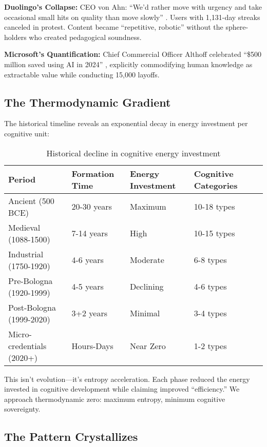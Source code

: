 \textbf{Duolingo's Collapse:} CEO von Ahn: ``We'd rather move with urgency and take occasional small hits on quality than move slowly'' \citep{vonahn2024}. Users with 1,131-day streaks canceled in protest. Content became ``repetitive, robotic'' without the sphere-holders who created pedagogical soundness.

\textbf{Microsoft's Quantification:} Chief Commercial Officer Althoff celebrated ``\$500 million saved using AI in 2024'' \citep{althoff2024}, explicitly commodifying human knowledge as extractable value while conducting 15,000 layoffs.

\subsection{The Thermodynamic Gradient}

The historical timeline reveals an exponential decay in energy investment per cognitive unit:

\begin{table}[h]
\centering
\begin{tabular}{lllll}
\hline
\textbf{Period} & \textbf{Formation Time} & \textbf{Energy Investment} & \textbf{Cognitive Categories} \\
\hline
Ancient (500 BCE) & 20-30 years & Maximum & 10-18 types \\
Medieval (1088-1500) & 7-14 years & High & 10-15 types \\
Industrial (1750-1920) & 4-6 years & Moderate & 6-8 types \\
Pre-Bologna (1920-1999) & 4-5 years & Declining & 4-6 types \\
Post-Bologna (1999-2020) & 3+2 years & Minimal & 3-4 types \\
Micro-credentials (2020+) & Hours-Days & Near Zero & 1-2 types \\
\hline
\end{tabular}
\caption{Historical decline in cognitive energy investment}
\end{table}

This isn't evolution---it's entropy acceleration. Each phase reduced the energy invested in cognitive development while claiming improved ``efficiency.'' We approach thermodynamic zero: maximum entropy, minimum cognitive sovereignty.

\subsection{The Pattern Crystallizes}

